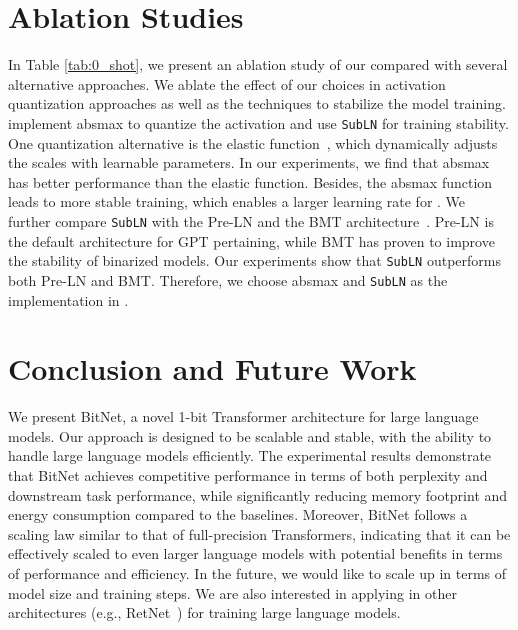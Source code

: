 \section{Ablation Studies}

In Table \ref{tab:0_shot}, we present an ablation study of our compared with several alternative approaches. We ablate the effect of our choices in activation quantization approaches as well as the techniques to stabilize the model training. \our{} implement absmax to quantize the activation and use \texttt{SubLN} for training stability. One quantization alternative is the elastic function~\cite{bit}, which dynamically adjusts the scales with learnable parameters. In our experiments, we find that absmax has better performance than the elastic function. Besides, the absmax function leads to more stable training, which enables a larger learning rate for \our{}. We further compare \texttt{SubLN} with the Pre-LN and the BMT architecture~\cite{bmt}. Pre-LN is the default architecture for GPT pertaining, while BMT has proven to improve the stability of binarized models. Our experiments show that \texttt{SubLN} outperforms both Pre-LN and BMT. Therefore, we choose absmax and \texttt{SubLN} as the implementation in \our{}.

\section{Conclusion and Future Work} We present BitNet, a novel 1-bit Transformer architecture for large language models. Our approach is designed to be scalable and stable, with the ability to handle large language models efficiently. The experimental results demonstrate that BitNet achieves competitive performance in terms of both perplexity and downstream task performance, while significantly reducing memory footprint and energy consumption compared to the baselines. Moreover, BitNet follows a scaling law similar to that of full-precision Transformers, indicating that it can be effectively scaled to even larger language models with potential benefits in terms of performance and efficiency. In the future, we would like to scale up \our{} in terms of model size and training steps. We are also interested in applying \our{} in other architectures (e.g., RetNet~\cite{retnet}) for training large language models.


